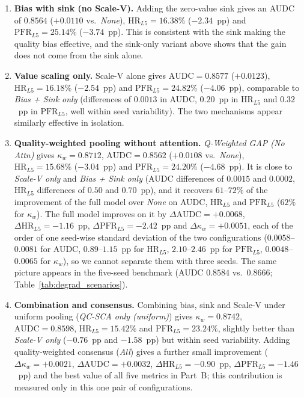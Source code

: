 \documentclass[final,5p,times,twocolumn,authoryear]{elsarticle}
\theoremstyle{plain}
\theoremstyle{remark}
\begin{document}
\begin{enumerate}
  \item \textbf{Bias with sink (no Scale-V).} Adding the zero-value sink gives an AUDC of $0.8564$ ($+0.0110$ vs.\ \emph{None}), $\text{HR}_{L5} = 16.38\%$ ($-2.34$~pp) and $\text{PFR}_{L5} = 25.14\%$ ($-3.74$~pp). This is consistent with the sink making the quality bias effective, and the sink-only variant above shows that the gain does not come from the sink alone.
  \item \textbf{Value scaling only.} Scale-V alone gives $\text{AUDC} = 0.8577$ ($+0.0123$), $\text{HR}_{L5} = 16.18\%$ ($-2.54$~pp) and $\text{PFR}_{L5} = 24.82\%$ ($-4.06$~pp), comparable to \emph{Bias + Sink only} (differences of $0.0013$ in AUDC, $0.20$~pp in $\text{HR}_{L5}$ and $0.32$~pp in $\text{PFR}_{L5}$, well within seed variability). The two mechanisms appear similarly effective in isolation.
  \item \textbf{Quality-weighted pooling without attention.} \emph{Q-Weighted GAP (No Attn)} gives $\kappa_w=0.8712$, $\text{AUDC}=0.8562$ ($+0.0108$ vs.\ \emph{None}), $\text{HR}_{L5}=15.68\%$ ($-3.04$~pp) and $\text{PFR}_{L5}=24.20\%$ ($-4.68$~pp). It is close to \emph{Scale-V only} and \emph{Bias + Sink only} (AUDC differences of $0.0015$ and $0.0002$, $\text{HR}_{L5}$ differences of $0.50$ and $0.70$~pp), and it recovers $61$--$72\%$ of the improvement of the full model over \emph{None} on AUDC, $\text{HR}_{L5}$ and $\text{PFR}_{L5}$ ($62\%$ for $\kappa_w$). The full model improves on it by $\Delta\text{AUDC}=+0.0068$, $\Delta\text{HR}_{L5}=-1.16$~pp, $\Delta\text{PFR}_{L5}=-2.42$~pp and $\Delta\kappa_w=+0.0051$, each of the order of one seed-wise standard deviation of the two configurations ($0.0058$--$0.0081$ for AUDC, $0.89$--$1.15$~pp for $\text{HR}_{L5}$, $2.10$--$2.46$~pp for $\text{PFR}_{L5}$, $0.0048$--$0.0065$ for $\kappa_w$), so we cannot separate them with three seeds. The same picture appears in the five-seed benchmark (AUDC $0.8584$ vs.\ $0.8666$; Table~\ref{tab:degrad_scenarios}).
  \item \textbf{Combination and consensus.} Combining bias, sink and Scale-V under uniform pooling (\emph{QC-SCA only (uniform)}) gives $\kappa_w = 0.8742$, $\text{AUDC} = 0.8598$, $\text{HR}_{L5} = 15.42\%$ and $\text{PFR}_{L5} = 23.24\%$, slightly better than \emph{Scale-V only} ($-0.76$~pp and $-1.58$~pp) but within seed variability. Adding quality-weighted consensus (\emph{All}) gives a further small improvement ($\Delta\kappa_w = +0.0021$, $\Delta\text{AUDC} = +0.0032$, $\Delta\text{HR}_{L5} = -0.90$~pp, $\Delta\text{PFR}_{L5} = -1.46$~pp) and the best value of all five metrics in Part~B; this contribution is measured only in this one pair of configurations.
\end{enumerate}
\end{document}
